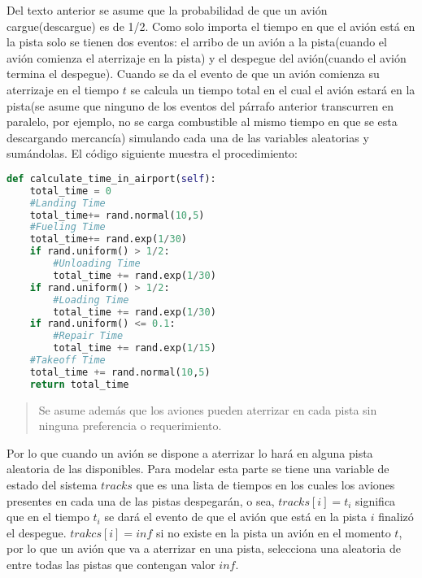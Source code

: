 \documentclass[12pt,letterpaper]{article}
\begin{document}
Del texto anterior se asume que la probabilidad de que un avi\'on cargue(descargue) es de 1/2. Como solo importa el tiempo en que el avi\'on est\'a en la pista solo se tienen dos eventos: el arribo de un avi\'on a la pista(cuando el avi\'on comienza el aterrizaje en la pista) y el despegue del avi\'on(cuando el avi\'on termina el despegue). Cuando se da el evento de que un avi\'on comienza su aterrizaje en el tiempo $t$ se calcula un tiempo total en el cual el avi\'on estar\'a en la pista(se asume que ninguno de los eventos del p\'arrafo anterior transcurren en paralelo, por ejemplo, no se carga combustible al mismo tiempo en que se esta descargando mercanc\'ia) simulando cada una de las variables aleatorias y sum\'andolas. El c\'odigo siguiente muestra el procedimiento:
\begin{lstlisting}[language=Python,caption= C\'alculo del tiempo total que toma un avi\'on en la pista]
def calculate_time_in_airport(self):
	total_time = 0
	#Landing Time
	total_time+= rand.normal(10,5)
	#Fueling Time
	total_time+= rand.exp(1/30)
	if rand.uniform() > 1/2:
		#Unloading Time
		total_time += rand.exp(1/30)
	if rand.uniform() > 1/2:
		#Loading Time
		total_time += rand.exp(1/30)
	if rand.uniform() <= 0.1:
		#Repair Time
		total_time += rand.exp(1/15)
	#Takeoff Time
	total_time += rand.normal(10,5)
	return total_time
\end{lstlisting}

\begin{quote}
	Se asume además que los aviones pueden aterrizar en cada pista sin ninguna preferencia o requerimiento.
\end{quote}
	
Por lo que cuando un avi\'on se dispone a aterrizar lo har\'a en alguna pista aleatoria de las disponibles. Para modelar esta parte se tiene una variable de estado del sistema $tracks$ que es una lista de tiempos en los cuales los aviones presentes en cada una de las pistas despegar\'an, o sea, $tracks[i] = t_i$ significa que en el tiempo $t_i$ se dar\'a el evento de que el avi\'on que est\'a en la pista $i$ finaliz\'o el despegue. $trakcs[i] = inf$ si no existe en la pista un avi\'on en el momento $t$, por lo que un avi\'on que va a aterrizar en una pista, selecciona una aleatoria de entre todas las pistas que contengan valor $inf$.  
\end{document}
